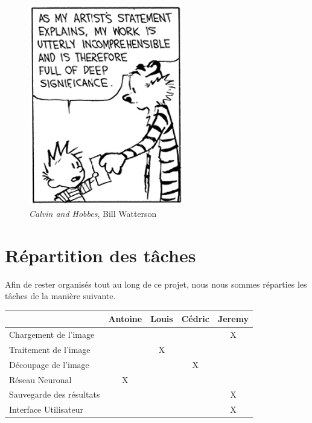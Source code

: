 \documentclass[12pt]{report}
\begin{document}
\begin{figure}
    \centering
    \includegraphics[width=0.6\textwidth]{project_mood_S1}
    \caption*{\textit{Calvin and Hobbes}, Bill Watterson}
\end{figure}

\chapter{Répartition des tâches}

Afin de rester organisés tout au long de ce projet, nous nous sommes réparties les tâches de la manière suivante.

\begin{center}
    \begin{tabular}{@{} l *4c @{}}
        \toprule
        \multicolumn{1}{c}{}    & \textbf{Antoine}  & \textbf{Louis}  & \textbf{Cédric} & \textbf{Jeremy} \\ 
        \midrule
        Chargement de l'image & & & & X \\
        Traitement de l'image & & X & & \\
        Découpage de l'image & & & X & \\
        Réseau Neuronal & X & & & \\
        Sauvegarde des résultats & & & & X \\
        Interface Utilisateur & & & & X \\
        \bottomrule
    \end{tabular}
\end{center}
\end{document}
